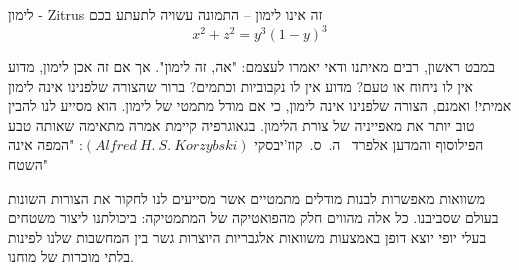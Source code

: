 \begin{surferPage}{ לימון - Zitrus}
זה אינו לימון – התמונה עשויה לתעתע בכם\\
\smallskip
\[x^2 + z^2 = y^3 (1 - y)^3\] 


\singlespacing
במבט ראשון, רבים מאיתנו ודאי יאמרו לעצמם: "אה, זה לימון". אך אם זה אכן לימון, מדוע אין לו ניחוח או טעם? מדוע אין לו נקבוביות וכתמים? ברור שהצורה שלפנינו אינה לימון אמיתי! 
\singlespacing
ואמנם, הצורה שלפנינו אינה לימון, כי אם מודל מתמטי של לימון. הוא מסייע לנו להבין טוב יותר את מאפייניה של צורת הלימון. בגאוגרפיה קיימת אמרה מתאימה שאותה טבע הפילוסוף והמדען אלפרד \ ה.\ ס.\ קוז'יבסקי $(Alfred\ H.\ S.\ Korzybski)$: "המפה אינה השטח" \\
\singlespacing

משוואות מאפשרות לבנות מודלים מתמטיים אשר מסייעים לנו לחקור את הצורות השונות בעולם שסביבנו. 
\singlespacing
כל אלה מהווים חלק מהפואטיקה של המתמטיקה: ביכולתנו ליצור משטחים בעלי יופי יוצא דופן באמצעות משוואות אלגבריות היוצרות גשר בין המחשבות שלנו לפינות בלתי מוכרות של מוחנו.
\end{surferPage}
